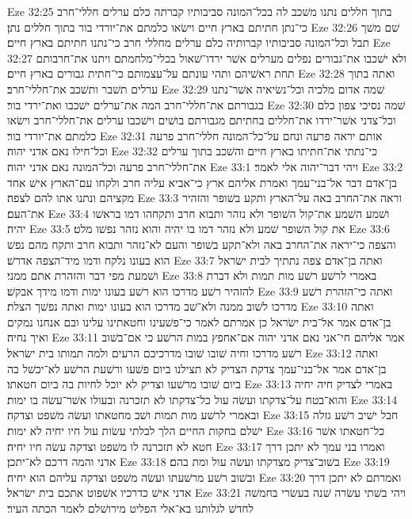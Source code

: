 Eze 32:25  בתוך חללים נתנו משׁכב לה בכל־המונה סביבותיו קברתה כלם ערלים חללי־חרב כי־נתן חתיתם בארץ חיים וישׂאו כלמתם את־יורדי בור בתוך חללים נתן׃
Eze 32:26  שׁם משׁך תבל וכל־המונה סביבותיו קברותיה כלם ערלים מחללי חרב כי־נתנו חתיתם בארץ חיים׃
Eze 32:27  ולא ישׁכבו את־גבורים נפלים מערלים אשׁר ירדו־שׁאול בכלי־מלחמתם ויתנו את־חרבותם תחת ראשׁיהם ותהי עונתם על־עצמותם כי־חתית גבורים בארץ חיים׃
Eze 32:28  ואתה בתוך ערלים תשׁבר ותשׁכב את־חללי־חרב׃
Eze 32:29  שׁמה אדום מלכיה וכל־נשׂיאיה אשׁר־נתנו בגבורתם את־חללי־חרב המה את־ערלים ישׁכבו ואת־ירדי בור׃
Eze 32:30  שׁמה נסיכי צפון כלם וכל־צדני אשׁר־ירדו את־חללים בחתיתם מגבורתם בושׁים וישׁכבו ערלים את־חללי־חרב וישׂאו כלמתם את־יורדי בור׃
Eze 32:31  אותם יראה פרעה ונחם על־כל־המונה חללי־חרב פרעה וכל־חילו נאם אדני יהוה׃
Eze 32:32  כי־נתתי את־חתיתו בארץ חיים והשׁכב בתוך ערלים את־חללי־חרב פרעה וכל־המונה נאם אדני יהוה׃
Eze 33:1  ויהי דבר־יהוה אלי לאמר׃
Eze 33:2  בן־אדם דבר אל־בני־עמך ואמרת אליהם ארץ כי־אביא עליה חרב ולקחו עם־הארץ אישׁ אחד מקציהם ונתנו אתו להם לצפה׃
Eze 33:3  וראה את־החרב באה על־הארץ ותקע בשׁופר והזהיר את־העם׃
Eze 33:4  ושׁמע השׁמע את־קול השׁופר ולא נזהר ותבוא חרב ותקחהו דמו בראשׁו יהיה׃
Eze 33:5  את קול השׁופר שׁמע ולא נזהר דמו בו יהיה והוא נזהר נפשׁו מלט׃
Eze 33:6  והצפה כי־יראה את־החרב באה ולא־תקע בשׁופר והעם לא־נזהר ותבוא חרב ותקח מהם נפשׁ הוא בעונו נלקח ודמו מיד־הצפה אדרשׁ׃
Eze 33:7  ואתה בן־אדם צפה נתתיך לבית ישׂראל ושׁמעת מפי דבר והזהרת אתם ממני׃
Eze 33:8  באמרי לרשׁע רשׁע מות תמות ולא דברת להזהיר רשׁע מדרכו הוא רשׁע בעונו ימות ודמו מידך אבקשׁ׃
Eze 33:9  ואתה כי־הזהרת רשׁע מדרכו לשׁוב ממנה ולא־שׁב מדרכו הוא בעונו ימות ואתה נפשׁך הצלת׃
Eze 33:10  ואתה בן־אדם אמר אל־בית ישׂראל כן אמרתם לאמר כי־פשׁעינו וחטאתינו עלינו ובם אנחנו נמקים ואיך נחיה׃
Eze 33:11  אמר אליהם חי־אני נאם אדני יהוה אם־אחפץ במות הרשׁע כי אם־בשׁוב רשׁע מדרכו וחיה שׁובו שׁובו מדרכיכם הרעים ולמה תמותו בית ישׂראל׃
Eze 33:12  ואתה בן־אדם אמר אל־בני־עמך צדקת הצדיק לא תצילנו ביום פשׁעו ורשׁעת הרשׁע לא־יכשׁל בה ביום שׁובו מרשׁעו וצדיק לא יוכל לחיות בה ביום חטאתו׃
Eze 33:13  באמרי לצדיק חיה יחיה והוא־בטח על־צדקתו ועשׂה עול כל־צדקתו לא תזכרנה ובעולו אשׁר־עשׂה בו ימות׃
Eze 33:14  ובאמרי לרשׁע מות תמות ושׁב מחטאתו ועשׂה משׁפט וצדקה׃
Eze 33:15  חבל ישׁיב רשׁע גזלה ישׁלם בחקות החיים הלך לבלתי עשׂות עול חיו יחיה לא ימות׃
Eze 33:16  כל־חטאתו אשׁר חטא לא תזכרנה לו משׁפט וצדקה עשׂה חיו יחיה׃
Eze 33:17  ואמרו בני עמך לא יתכן דרך אדני והמה דרכם לא־יתכן׃
Eze 33:18  בשׁוב־צדיק מצדקתו ועשׂה עול ומת בהם׃
Eze 33:19  ובשׁוב רשׁע מרשׁעתו ועשׂה משׁפט וצדקה עליהם הוא יחיה׃
Eze 33:20  ואמרתם לא יתכן דרך אדני אישׁ כדרכיו אשׁפוט אתכם בית ישׂראל׃
Eze 33:21  ויהי בשׁתי עשׂרה שׁנה בעשׂרי בחמשׁה לחדשׁ לגלותנו בא־אלי הפליט מירושׁלם לאמר הכתה העיר׃
